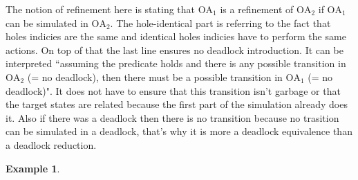 \documentclass{article}
\theoremstyle{plain}
\theoremstyle{definition}
\newtheorem{exi}{Example}
\begin{document}
The notion of refinement here is stating that \(\mathrm{OA}_1\) is a refinement of \(\mathrm{OA}_2\) if \(\mathrm{OA}_1\) can be simulated in \(\mathrm{OA}_2\).
The hole-identical part is referring to the fact that holes indicies are the same and identical holes indicies have to perform the same actions.
On top of that the last line ensures no deadlock introduction.
It can be interpreted ``assuming the predicate holds and there is any possible transition in \(\mathrm{OA}_2\) (= no deadlock), then there must be a possible transition in \(\mathrm{OA}_1\) (= no deadlock)".
It does not have to ensure that this transition isn't garbage or that the target states are related because the first part of the simulation already does it.
Also if there was a deadlock then there is no transition because no trasition can be simulated in a deadlock, that's why it is more a deadlock equivalence than a deadlock reduction.

\begin{exi} %
\end{exi}
\end{document}
